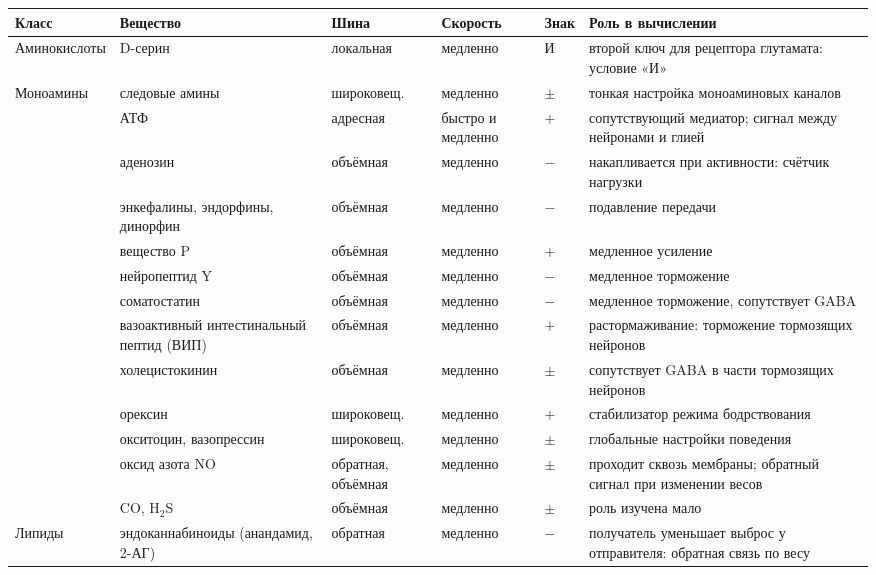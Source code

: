 \begin{table}[t]
\centering
\footnotesize
\setlength{\tabcolsep}{4pt}
\renewcommand{\arraystretch}{1.12}
\begin{tabular}{>{\raggedright}p{2.25cm}>{\raggedright}p{2.8cm}>{\raggedright}p{1.8cm}>{\raggedright}p{1.5cm}>{\centering}p{0.8cm}>{\raggedright\arraybackslash}p{4.3cm}}
\toprule
Класс & Вещество & Шина & Скорость & Знак & Роль в вычислении \\
\midrule
Аминокислоты & D-серин & локальная & медленно & И & второй ключ для рецептора глутамата: условие «И» \\
\midrule
Моноамины & следовые амины & широковещ. & медленно & $\pm$ & тонкая настройка моноаминовых каналов \\
\midrule
\multirow{2}{2.25cm}{Пурины}
 & АТФ & адресная & быстро и медленно & $+$ & сопутствующий медиатор; сигнал между нейронами и глией \\
 & аденозин & объёмная & медленно & $-$ & накапливается при активности: счётчик нагрузки~\cite{Dunwiddie2001} \\
\midrule
\multirow{8}{2.25cm}{Нейропептиды (больше сотни)}
 & энкефалины, эндорфины, динорфин & объёмная & медленно & $-$ & подавление передачи \\
 & вещество P & объёмная & медленно & $+$ & медленное усиление \\
 & нейропептид Y & объёмная & медленно & $-$ & медленное торможение \\
 & соматостатин & объёмная & медленно & $-$ & медленное торможение, сопутствует GABA \\
 & вазоактивный интестинальный пептид (ВИП) & объёмная & медленно & $+$ & растормаживание: торможение тормозящих нейронов \\
 & холецистокинин & объёмная & медленно & $\pm$ & сопутствует GABA в части тормозящих нейронов \\
 & орексин & широковещ. & медленно & $+$ & стабилизатор режима бодрствования \\
 & окситоцин, вазопрессин & широковещ. & медленно & $\pm$ & глобальные настройки поведения \\
\midrule
\multirow{2}{2.25cm}{Газы}
 & оксид азота NO & обратная, объёмная & медленно & $\pm$ & проходит сквозь мембраны; обратный сигнал при изменении весов~\cite{Garthwaite2008} \\
 & CO, H$_2$S & объёмная & медленно & $\pm$ & роль изучена мало \\
\midrule
Липиды & эндоканнабиноиды (анандамид, 2-АГ) & обратная & медленно & $-$ & получатель уменьшает выброс у отправителя: обратная связь по весу~\cite{WilsonNicoll2001} \\

\end{tabular}
\end{table}
